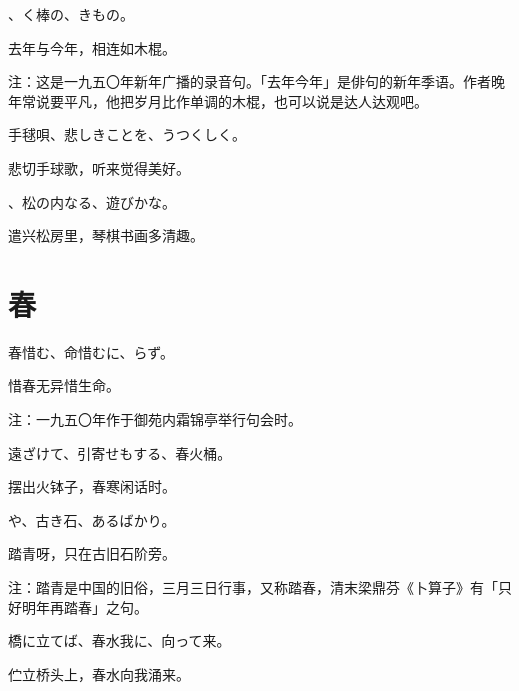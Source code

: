 \setcounter{haikucounter}{0}

\begin{haiku}
    {\FH {}、く棒の、きもの。}

    {\FK 去年与今年，相连如木棍。}

    {\FT 注：这是一九五〇年新年广播的录音句。「去年今年」是俳句的新年季语。作者晚年常说要平凡，他把岁月比作单调的木棍，也可以说是达人达观吧。}
\end{haiku}

\begin{haiku}
    {\FH 手毬唄、悲しきことを、うつくしく。}

    {\FK 悲切手球歌，听来觉得美好。}
\end{haiku}

\begin{haiku}
    {\FH {}、松の内なる、遊びかな。}

    {\FK 遣兴松房里，琴棋书画多清趣。}
\end{haiku}

\section{\FK 春}

\setcounter{haikucounter}{0}

\begin{haiku}
    {\FH 春惜む、命惜むに、らず。}

    {\FK 惜春无异惜生命。}

    {\FT 注：一九五〇年作于御苑内霜锦亭举行句会时。}
\end{haiku}

\begin{haiku}
    {\FH 遠ざけて、引寄せもする、春火桶。}

    {\FK 摆出火钵子，春寒闲话时。}
\end{haiku}

\begin{haiku}
    {\FH {}や、古き石、あるばかり。}

    {\FK 踏青呀，只在古旧石阶旁。}

    {\FT 注：踏青是中国的旧俗，三月三日行事，又称踏春，清末梁鼎芬《卜算子》有「只好明年再踏春」之句。}
\end{haiku}

\begin{haiku}
    {\FH 橋に立てば、春水我に、向って来。}

    {\FK 伫立桥头上，春水向我涌来。}
\end{haiku}

